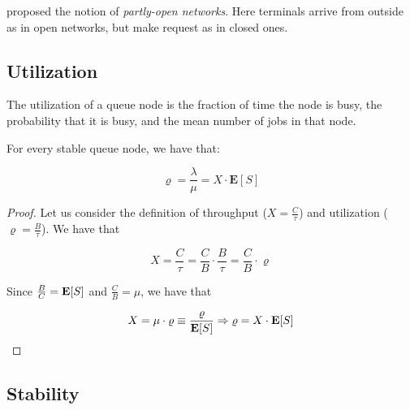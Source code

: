 
\cite{schroeder2006open} proposed the notion of \textit{partly-open networks}. Here terminals arrive from outside as in open networks, but make request as in closed ones.




\subsection{Utilization}
\label{sec:Utilization}

The utilization of a queue node is the fraction of time the node is busy, the probability that it is busy, and the mean number of jobs in that node.

\begin{theorem}
\label{thm:Utilization-Law}

	For every stable queue node, we have that:
	
	\begin{equation}
	\label{eqn:Utilization-Law}
	\varrho = \frac{\lambda}{\mu} = X \cdot \mathbf{E}[S]
	\end{equation}
	
	\begin{proof}
		Let us consider the definition of throughput ($X=\frac{C}{\tau}$) and utilization ($\varrho=\frac{B}{\tau}$). We have that
		
		\begin{equation*}
			X = \frac{C}{\tau} = \frac{C}{B} \cdot \frac{B}{\tau} = \frac{C}{B} \cdot \varrho
		\end{equation*}
		
		Since $\frac{B}{C}=\mathbf{E}[S]$ and $\frac{C}{B}=\mu$, we have that
		
		\begin{equation*}
			X = \mu \cdot \varrho \equiv \frac{\varrho}{\mathbf{E}[S]} \Rightarrow \varrho = X \cdot \mathbf{E}[S]
		\end{equation*}
	\end{proof}
\end{theorem}




\subsection{Stability}
\label{sec:Stability}


